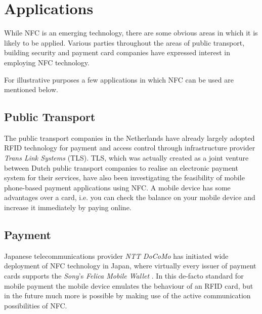 \section{Applications}
While NFC is an emerging technology, there are some obvious areas in which it is likely to be applied.
Various parties throughout the areas of public transport, building security and payment card companies have expressed interest in employing NFC technology.

For illustrative purposes a few applications in which NFC can be used are mentioned below.

\subsection{Public Transport}
The public transport companies in the Netherlands have already largely adopted RFID technology for payment and access control through infrastructure provider \textit{Trans Link Systems} (TLS).
TLS, which was actually created as a joint venture between Dutch public transport companies to realise an electronic payment system for their services, have also been investigating the feasibility of mobile phone-based payment applications using NFC. %
A mobile device has some advantages over a card, i.e. you can check the balance on your mobile device and increase it immediately by paying online. %


\subsection{Payment}
Japanese telecommunications provider \textit{NTT DoCoMo} has initiated wide deployment of NFC technology in Japan, where virtually every issuer of payment cards supports the \textit{Sony}'s \textit{Felica Mobile Wallet} \cite{yamauchi2006intensive,}.
In this de-facto standard for mobile payment the mobile device emulates the behaviour of an RFID card, but in the future much more is possible by making use of the active communication possibilities of NFC. %

